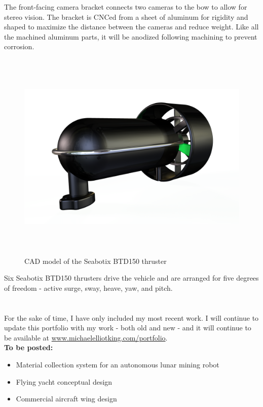 \documentclass[12pt, landscape]{article}
\begin{document}
	The front-facing camera bracket connects two cameras to the bow to allow for stereo vision.  The bracket is CNCed from a sheet of aluminum for rigidity and shaped to maximize the distance between the cameras and reduce weight.  Like all the machined aluminum parts, it will be anodized following machining to prevent corrosion.

	\begin{figure}[H]
		\centering
		\includegraphics[height=4in]{media/THRUSTER-RENDER-2-ALPHA.png}
		\caption{CAD model of the Seabotix BTD150 thruster}
		\label{thruster}
	\end{figure}

	Six Seabotix BTD150 thrusters drive the vehicle and are arranged for five degrees of freedom - active surge, sway, heave, yaw, and pitch.

	\clearpage

\section{}
	{\LARGE For the sake of time, I have only included my most recent work.  I will continue to update this portfolio with my work - both old and new - and it will continue to be available at \href{http://www/michaelelliotking.com/portfolio}{www.michaelelliotking.com/portfolio}.}\\[20pt]

	\textbf{To be posted:}
	\begin{itemize}
		\item Material collection system for an autonomous lunar mining robot
		\item Flying yacht conceptual design
		\item Commercial aircraft wing design
	\end{itemize}
\end{document}
